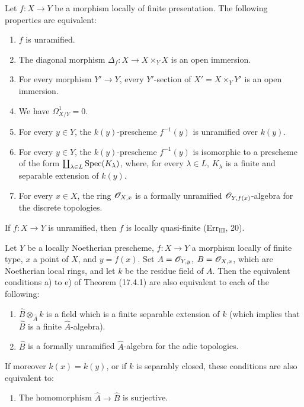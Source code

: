 \begin{corollary}[17.4.2]
\label{IV.17.4.2}
Let $f:X\to Y$ be a morphism locally of finite presentation. The following properties are equivalent:
\begin{enumerate}
  \item[a)] $f$ is unramified.
  \item[b)] The diagonal morphism $\Delta_f:X\to X\times_Y X$ is an open immersion.
  \item[b')] For every morphism $Y'\to Y$, every $Y'$-section of $X'=X\times_Y Y'$ is an open immersion.
  \item[c)] We have $\Omega^1_{X/Y}=0$.
  \item[d)] For every $y\in Y$, the $k(y)$-prescheme $f^{-1}(y)$ is unramified over $k(y)$.
  \item[d')] For every $y\in Y$, the $k(y)$-prescheme $f^{-1}(y)$ is isomorphic to a prescheme of the form $\coprod_{\lambda\in L}\operatorname{Spec}(K_\lambda)$, where, for every $\lambda\in L$, $K_\lambda$ is a finite and separable extension of $k(y)$.
  \item[e)] For every $x\in X$, the ring $\mathscr{O}_{X,x}$ is a formally unramified $\mathscr{O}_{Y,f(x)}$-algebra for the discrete topologies.
\end{enumerate}
\end{corollary}

\begin{corollary}[17.4.3]
\label{IV.17.4.3}
If $f:X\to Y$ is unramified, then $f$ is locally quasi-finite (Err$_{\mathrm{III}}$, 20).
\end{corollary}

\begin{proposition}[17.4.4]
\label{IV.17.4.4}
Let $Y$ be a locally Noetherian prescheme, $f:X\to Y$ a morphism locally of finite type, $x$ a point of $X$, and $y=f(x)$. Set $A=\mathscr{O}_{Y,y}$, $B=\mathscr{O}_{X,x}$, which are Noetherian local rings, and let $k$ be the residue field of $A$. Then the equivalent conditions a) to e) of Theorem (17.4.1) are also equivalent to each of the following:
\begin{enumerate}
  \item[f)] $\widehat{B}\otimes_{\widehat{A}}k$ is a field which is a finite separable extension of $k$ (which implies that $\widehat{B}$ is a finite $\widehat{A}$-algebra).
  \item[f')] $\widehat{B}$ is a formally unramified $\widehat{A}$-algebra for the adic topologies.
\end{enumerate}
If moreover $k(x)=k(y)$, or if $k$ is separably closed, these conditions are also equivalent to:
\begin{enumerate}
  \item[f'')] The homomorphism $\widehat{A}\to\widehat{B}$ is surjective.
\end{enumerate}
\end{proposition}


